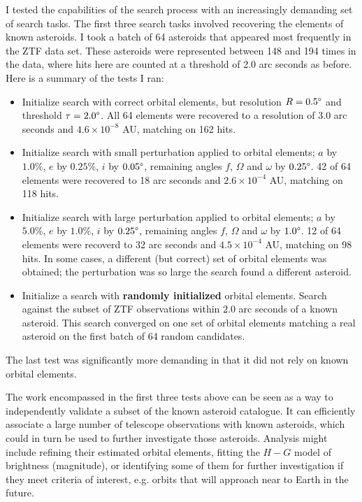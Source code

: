 I tested the capabilities of the search process with an increasingly demanding set of search tasks.
The first three search tasks involved recovering the elements of known asteroids.
I took a batch of 64 asteroids that appeared most frequently in the ZTF data set.
These asteroids were represented between 148 and 194 times in the data, 
where hits here are counted at a threshold of 2.0 arc seconds as before.
Here is a summary of the tests I ran:
\begin{itemize}
\item Initialize search with correct orbital elements, but resolution $R = 0.5 \degree$ and threshold $\tau = 2.0 \degree$.
All 64 elements were recovered to a resolution of 3.0 arc seconds and $4.6\times 10^{-8}$ AU, matching on 162 hits.
\item Initialize search with small perturbation applied to orbital elements; $a$ by $1.0\%$, $e$ by $0.25\%$, $i$ by $0.05 \degree$,
remaining angles $f$, $\Omega$ and $\omega$ by $0.25 \degree$.
42 of 64 elements were recovered to 18 arc seconds and $2.6 \times 10^{-4}$ AU, matching on 118 hits.
\item Initialize search with large perturbation applied to orbital elements; $a$ by $5.0\%$, $e$ by $1.0\%$, $i$ by $0.25 \degree$,
remaining angles $f$, $\Omega$ and $\omega$ by $1.0 \degree$.
12 of 64 elements were recoverd to 32 arc seconds and $4.5 \times10^{-4}$ AU, matching on 98 hits.
In some cases, a different (but correct) set of orbital elements was obtained;
the perturbation was so large the search found a different asteroid.
\item Initialize a search with \textbf{randomly initialized} orbital elements.
Search against the subset of ZTF observations within $2.0$ arc seconds of a known asteroid.
This search converged on one set of orbital elements matching a real asteroid on the first batch of 64 random candidates.
\end{itemize}
The last test was significantly more demanding in that it did not rely on known orbital elements.

The work encompassed in the first three tests above can be seen as a way to independently validate a subset of the known asteroid catalogue.
It can efficiently associate a large number of telescope observations with known asteroids,
which could in turn be used to further investigate those asteroids.
Analysis might include refining their estimated orbital elements, 
fitting the $H-G$ model of brightness (magnitude), or identifying some of them for further investigation if they meet criteria of interest,
e.g. orbits that will approach near to Earth in the future.

